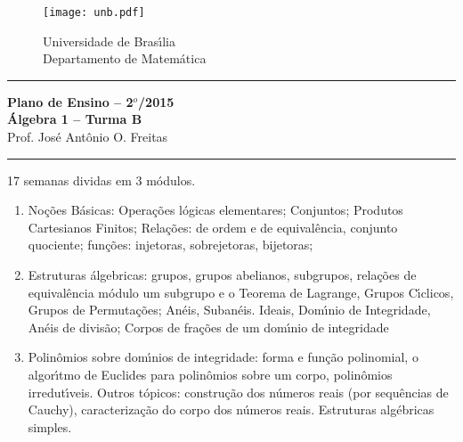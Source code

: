 \documentclass[12pt]{article}
\begin{document}
\pagestyle{empty}

\begin{figure}[h]
    \begin{minipage}[c]{1.7cm}
    \texttt{[image: unb.pdf]}
    \end{minipage}%
    \hspace{0pt}
    \begin{minipage}[c]{4in}
    {Universidade de Bras{\'\i}lia} \\
    {Departamento de Matem{\'a}tica}
    \end{minipage}
\end{figure}
\vspace{-0.9cm}
\hrule

\begin{center}
{\large\bf Plano de Ensino -- 2$^{o}$/2015} \\
{\large\bf \'Algebra 1 -- Turma B}\\
Prof. Jos{\'e} Ant{\^o}nio O. Freitas
\end{center}
\hrule
\vspace{0.25cm}
 17 semanas dividas em 3 m\'{o}dulos.
\begin{enumerate}[1)]

\item No\c{c}\~oes B\'asicas: Opera\c{c}\~oes l\'ogicas elementares; Conjuntos; Produtos Cartesianos Finitos; Rela\c{c}\~oes: de ordem e de equival\^encia, conjunto quociente; fun\c{c}\~oes: injetoras, sobrejetoras, bijetoras; 

\item Estruturas \'algebricas: grupos, grupos abelianos, subgrupos, rela\c{c}\~oes de equival\^encia m\'odulo um subgrupo e o Teorema de Lagrange, Grupos C{\'\i}clicos, Grupos de Permuta\c{c}\~oes; An\'eis, Suban\'eis. Ideais, Dom{\'\i}nio de Integridade, An\'eis de divis\~ao; Corpos de fra\c{c}\~oes de um dom{\'\i}nio de integridade

\item Polin\^omios sobre dom{\'\i}nios de integridade: forma e fun\c{c}\~ao polinomial, o algor{\'\i}tmo de Euclides para polin\^omios sobre um corpo, polin\^omios irredut{\'\i}veis. Outros t\'opicos: constru\c{c}\~ao dos n\'umeros reais (por sequ\^encias de Cauchy), caracteriza\c{c}\~ao do corpo dos n\'umeros reais. Estruturas alg\'ebricas simples.
\end{enumerate}
\end{document}
